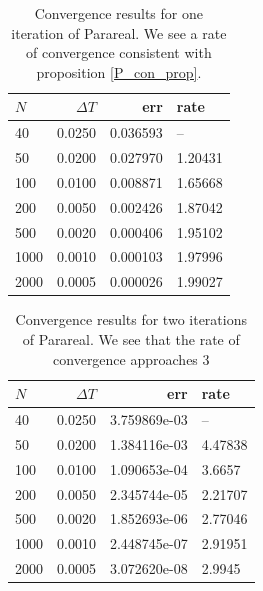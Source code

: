 \begin{table}[h]
\centering
\caption{Convergence results for one iteration of Parareal. We see a rate of convergence consistent with proposition \ref{P_con_prop}.}
\label{par_con2}
\begin{tabular}{lrrl}
\toprule
{}$N$ &      $\Delta T$ &       err &     rate \\
\midrule
40   &  0.0250 &  0.036593 &       -- \\
50   &  0.0200 &  0.027970 &  1.20431 \\
100  &  0.0100 &  0.008871 &  1.65668 \\
200  &  0.0050 &  0.002426 &  1.87042 \\
500  &  0.0020 &  0.000406 &  1.95102 \\
1000 &  0.0010 &  0.000103 &  1.97996 \\
2000 &  0.0005 &  0.000026 &  1.99027 \\
\bottomrule
\end{tabular}
\end{table}
\begin{table}[h]
\centering
\caption{Convergence results for two iterations of Parareal. We see that the rate of convergence approaches 3}
\label{par_con3}
\begin{tabular}{lrrl}
\toprule
{}$N$ &      $\Delta T$ &       err &     rate \\
\midrule
40   &  0.0250 &  3.759869e-03 &       -- \\
50   &  0.0200 &  1.384116e-03 &  4.47838 \\
100  &  0.0100 &  1.090653e-04 &   3.6657 \\
200  &  0.0050 &  2.345744e-05 &  2.21707 \\
500  &  0.0020 &  1.852693e-06 &  2.77046 \\
1000 &  0.0010 &  2.448745e-07 &  2.91951 \\
2000 &  0.0005 &  3.072620e-08 &   2.9945 \\
\bottomrule
\end{tabular}
\end{table}
